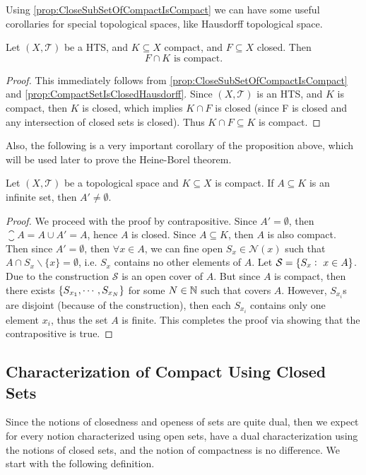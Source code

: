 Using \autoref{prop:CloseSubSetOfCompactIsCompact} we can have some useful corollaries for special topological spaces, like Hausdorff topological space. 

\begin{corollary}
	Let $(X,\mathcal{T})$ be a HTS, and $K \subseteq X$ compact, and $F \subseteq X$ closed. Then
	\[ F \cap K \text{ is compact}. \]
\end{corollary}
\begin{proof}
	This immediately follows from \autoref{prop:CloseSubSetOfCompactIsCompact} and \autoref{prop:CompactSetIsClosedHausdorff}. Since $(X,\mathcal{T})$ is an HTS, and $K$ is compact, then $K$ is closed, which implies $K\cap F$ is closed (since F is closed and any intersection of closed sets is closed). Thus $K \cap F \subseteq K$ is compact.  
\end{proof}

Also, the following is a very important corollary of the proposition above, which will be used later to prove the Heine-Borel theorem.

\begin{corollary}
	\label{cor:InfiniteSubsetOfCompactSetNotEmptDerSet}
	Let $(X,\mathcal{T})$ be a topological space and $K \subseteq X$ is compact. If $A \subseteq K$ is an infinite set, then $A' \neq \emptyset$.
\end{corollary}
\begin{proof}
	We proceed with the proof by contrapositive. Since $A' = \emptyset$, then $\closure A = A \cup A' = A$, hence $A$ is closed. Since $A \subseteq K$, then $A$ is also compact. Then since $A' = \emptyset$, then $\forall x \in A$, we can fine open $S_x \in \mathcal{N}(x)$ such that $A \cap S_x \backslash \{x\} = \emptyset$, i.e. $S_x$ contains no other elements of $A$. Let $\mathcal{S} = \{S_x:\ x \in A\}$. Due to the construction $\mathcal{S}$ is an open cover of $A$. But since $A$ is compact, then there exists $\{S_{x_1},\cdots,S_{x_N}\}$ for some $N \in \mathbb{N}$ such that covers $A$. However, $S_{x_i}$s are disjoint (because of the construction), then each $S_{x_i}$ contains only one element $x_i$, thus the set $A$ is finite. This completes the proof via showing that the contrapositive is true.
\end{proof}

\subsection{Characterization of Compact Using Closed Sets}
Since the notions of closedness and openess of sets are quite dual, then we expect for every notion characterized using open sets, have a dual characterization using the notions of closed sets, and the notion of compactness is no difference. We start with the following definition.

